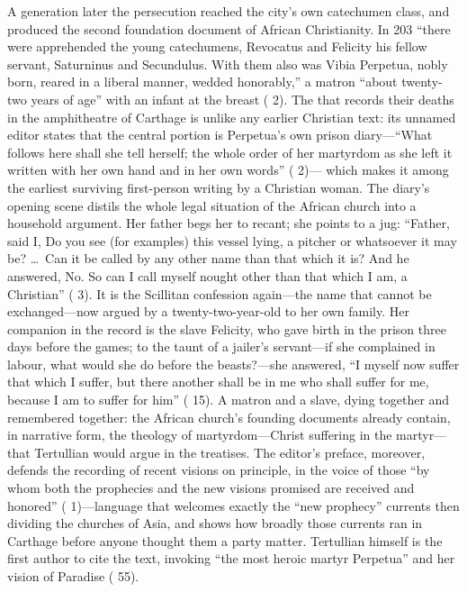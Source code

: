 A generation later the persecution reached the city's own catechumen class,
and produced the second foundation document of African Christianity. In 203
``there were apprehended the young catechumens, Revocatus and Felicity his
fellow servant, Saturninus and Secundulus. With them also was Vibia Perpetua,
nobly born, reared in a liberal manner, wedded honorably,'' a matron ``about
twenty-two years of age'' with an infant at the breast ( 2). The  that records their deaths in the
amphitheatre of Carthage is unlike any earlier Christian text: its unnamed
editor states that the central portion is Perpetua's own prison diary---``What
follows here shall she tell herself; the whole order of her martyrdom as she
left it written with her own hand and in her own words'' ( 2)---
which makes it among the earliest surviving first-person writing by a
Christian woman. The diary's opening scene distils the whole legal situation
of the African church into a household argument. Her father begs her to
recant; she points to a jug: ``Father, said I, Do you see (for examples) this
vessel lying, a pitcher or whatsoever it may be? \ldots\ Can it be called by
any other name than that which it is? And he answered, No. So can I call
myself nought other than that which I am, a Christian'' ( 3).
It is the Scillitan confession again---the name that cannot be
exchanged---now argued by a twenty-two-year-old to her own family. Her
companion in the record is the slave Felicity, who gave birth in the prison
three days before the games; to the taunt of a jailer's servant---if she
complained in labour, what would she do before the beasts?---she answered,
``I myself now suffer that which I suffer, but there another shall be in me
who shall suffer for me, because I am to suffer for him'' (
15). A matron and a slave, dying together and remembered together: the
African church's founding documents already contain, in narrative form, the
theology of martyrdom---Christ suffering in the martyr---that Tertullian
would argue in the treatises. The editor's preface, moreover, defends the recording of
recent visions on principle, in the voice of those ``by whom both the
prophecies and the new visions promised are received and honored''
( 1)---language that welcomes exactly the ``new prophecy''
currents then dividing the churches of Asia, and shows how broadly those
currents ran in Carthage before anyone thought them a party matter.
Tertullian himself is the first author to cite the text, invoking ``the most
heroic martyr Perpetua'' and her vision of Paradise ( 55).

